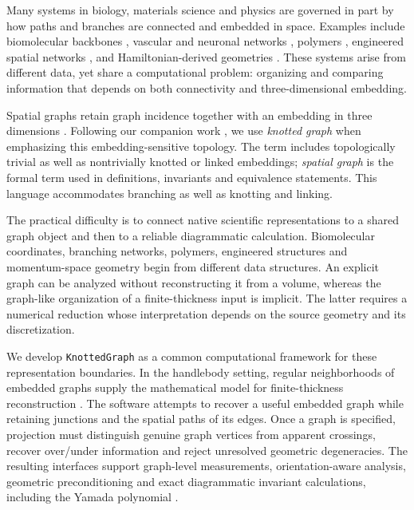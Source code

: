 \documentclass[10pt,twocolumn]{article}
\begin{document}
Many systems in biology, materials science and physics are governed in part by how paths and branches are connected and embedded in space. Examples include biomolecular backbones \cite{kg_burley2019rcsb,kg_yeates2007protein_topology}, vascular \cite{kg_aylward2005spatial_vascular} and neuronal networks \cite{kg_cuntz2010neuronal_graphs}, polymers \cite{kg_deguchi2017topological_polymers}, engineered spatial networks \cite{kg_peddada2023}, and Hamiltonian-derived geometries \cite{kg_fang2016nodal_line,akgun_yan_2026topologicalclassificationknottedgraphs}. These systems arise from different data, yet share a computational problem: organizing and comparing information that depends on both connectivity and three-dimensional embedding.

Spatial graphs retain graph incidence together with an embedding in three dimensions \cite{kg_kauffman1989spatial,kg_flapan2017spatial,kg_mellor2018spatial}. Following our companion work \cite{akgun_yan_2026topologicalclassificationknottedgraphs}, we use \emph{knotted graph} when emphasizing this embedding-sensitive topology. The term includes topologically trivial as well as nontrivially knotted or linked embeddings; \emph{spatial graph} is the formal term used in definitions, invariants and equivalence statements. This language accommodates branching as well as knotting and linking.

The practical difficulty is to connect native scientific representations to a shared graph object and then to a reliable diagrammatic calculation. Biomolecular coordinates, branching networks, polymers, engineered structures and momentum-space geometry begin from different data structures. An explicit graph can be analyzed without reconstructing it from a volume, whereas the graph-like organization of a finite-thickness input is implicit. The latter requires a numerical reduction whose interpretation depends on the source geometry and its discretization.

We develop \texttt{KnottedGraph} as a common computational framework for these representation boundaries. In the handlebody setting, regular neighborhoods of embedded graphs supply the mathematical model for finite-thickness reconstruction \cite{kg_ishii2008handlebody,kg_ishii2012handlebody}. The software attempts to recover a useful embedded graph while retaining junctions and the spatial paths of its edges. Once a graph is specified, projection must distinguish genuine graph vertices from apparent crossings, recover over/under information and reject unresolved geometric degeneracies. The resulting interfaces support graph-level measurements, orientation-aware analysis, geometric preconditioning and exact diagrammatic invariant calculations, including the Yamada polynomial \cite{kg_yamada1989,kg_mellor2018spatial}.
\end{document}
